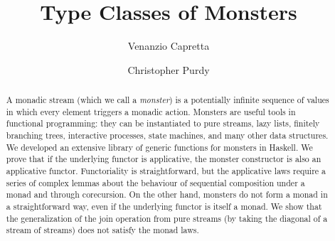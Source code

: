 \documentclass[runningheads]{llncs}
\begin{document}
\title{Type Classes of Monsters}

\author{Venanzio Capretta \and
        Christopher Purdy}



	
\maketitle


\newtheorem{lemmainner}{Lemma}
\newenvironment{lemmaa}[1]{%
  \renewcommand\thelemmainner{#1}%
  \lemmainner
}{\endlemmainner}


\newcommand{\repourl}{\url{https://github.com/venanzio/monster}}

\begin{abstract}
A monadic stream (which we call a {\em monster}) is a potentially infinite sequence of values in which every element triggers a monadic action.
Monsters are useful tools in functional programming: they can be instantiated to pure streams, lazy lists, finitely branching trees, interactive processes, state machines, and many other data structures.
We developed an extensive library of generic functions for monsters in Haskell.
We prove that if the underlying functor is applicative, the monster constructor is also an applicative functor.
Functoriality is straightforward, but the applicative laws require a series of complex lemmas about the behaviour of sequential composition under a monad and through corecursion.
On the other hand, monsters do not form a monad in a straightforward way, even if the underlying functor is itself a monad.
We show that the generalization of the join operation from pure streams (by taking the diagonal of a stream of streams) does not satisfy the monad laws.
\end{abstract}









\appendix

\end{document}
